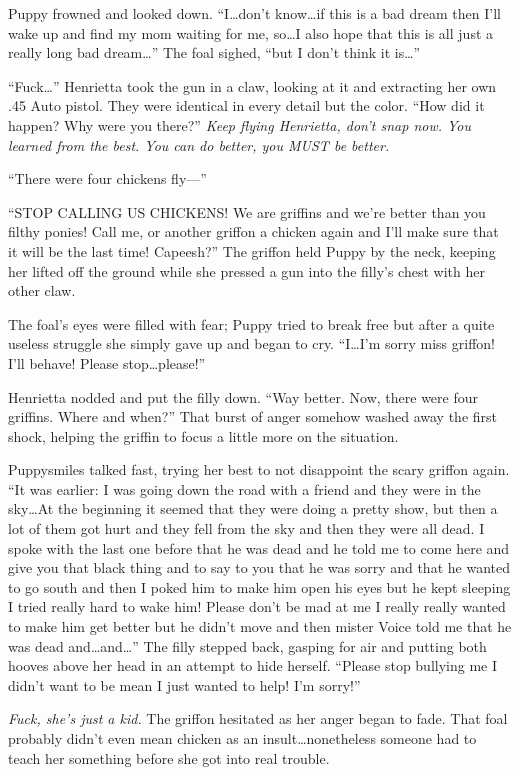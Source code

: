Puppy frowned and looked down. ``I\dots don't know\dots if this is a bad dream then I'll wake up and find my mom waiting for me, so\dots I also hope that this is all just a really long bad dream\dots'' The foal sighed, ``but I don't think it is\dots''

``Fuck\dots'' Henrietta took the gun in a claw, looking at it and extracting her own .45 Auto pistol. They were identical in every detail but the color. ``How did it happen? Why were you there?'' \emph{Keep flying Henrietta, don't snap now. You learned from the best. You can do better, you MUST be better.}

``There were four chickens fly---''

``STOP CALLING US CHICKENS! We are griffins and we're better than you filthy ponies! Call me, or another griffon a chicken again and I'll make sure that it will be the last time! Capeesh?'' The griffon held Puppy by the neck, keeping her lifted off the ground while she pressed a gun into the filly's chest with her other claw.

The foal's eyes were filled with fear; Puppy tried to break free but after a quite useless struggle she simply gave up and began to cry. ``I\dots I'm sorry miss griffon! I'll behave! Please stop\dots please!''

Henrietta nodded and put the filly down. ``Way better. Now, there were four griffins. Where and when?'' That burst of anger somehow washed away the first shock, helping the griffin to focus a little more on the situation.

Puppysmiles talked fast, trying her best to not disappoint the scary griffon again. ``It was earlier: I was going down the road with a friend and they were in the sky\dots At the beginning it seemed that they were doing a pretty show, but then a lot of them got hurt and they fell from the sky and then they were all dead. I spoke with the last one before that he was dead and he told me to come here and give you that black thing and to say to you that he was sorry and that he wanted to go south and then I poked him to make him open his eyes but he kept sleeping I tried really hard to wake him! Please don't be mad at me I really really wanted to make him get better but he didn't move and then mister Voice told me that he was dead and\dots and\dots'' The filly stepped back, gasping for air and putting both hooves above her head in an attempt to hide herself. ``Please stop bullying me I didn't want to be mean I just wanted to help! I'm sorry!''

\emph{Fuck, she's just a kid.} The griffon hesitated as her anger began to fade. That foal probably didn't even mean chicken as an insult\dots nonetheless someone had to teach her something before she got into real trouble.

